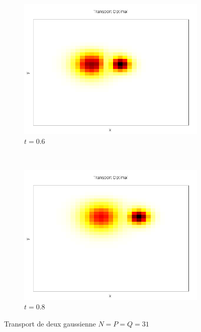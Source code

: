 \documentclass{beamer}
\begin{document}
\begin{frame}
\begin{figure}[!h]
\begin{subfigure}[b]{0.22\linewidth}
	\includegraphics[width=\textwidth]{img/2DMixture/C_00021.png}
	\caption{$t=0.6$}
	\end{subfigure}
	~
	\begin{subfigure}[b]{0.22\linewidth}
	\includegraphics[width=\textwidth]{img/2DMixture/C_00028.png}
	\caption{$t=0.8$}
	\end{subfigure}
	\caption{Transport de deux gaussienne $N=P=Q=31$}
\end{figure}
\end{frame}
\end{document}
